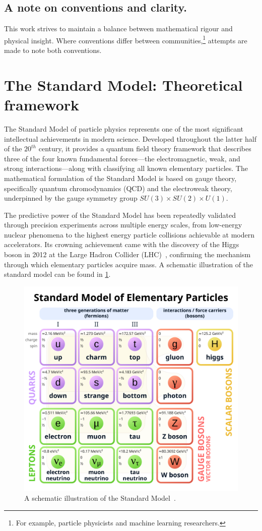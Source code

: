 \begin{definition}
    \subsection{A note on conventions and clarity.}
         This work strives to maintain a balance between mathematical rigour and physical insight.
         Where conventions differ between communities,\footnote{For example, particle physicists and machine learning researchers.} attempts are made to note both conventions.
         
\section{The Standard Model: Theoretical framework}
The Standard Model of particle physics represents one of the most significant intellectual achievements in modern science.
%
Developed throughout the latter half of the $20^{th}$ century, it provides a quantum field theory framework that describes three of the four known fundamental forces—the electromagnetic, weak, and strong interactions---along with classifying all known elementary particles.
%
The mathematical formulation of the Standard Model is based on gauge theory, specifically quantum chromodynamics (QCD) and the electroweak theory, underpinned by the gauge symmetry group \(SU(3)\times SU(2)\times U(1)\).

The predictive power of the Standard Model has been repeatedly validated through precision experiments across multiple energy scales, from low-energy nuclear phenomena to the highest energy particle collisions achievable at modern accelerators.
%
Its crowning achievement came with the discovery of the Higgs boson in 2012 at the Large Hadron Collider (LHC)~\cite{ATLAS:2012yve, collaboration_observation_2012}, confirming the mechanism through which elementary particles acquire mass.
%
A schematic illustration of the standard model can be found in \cref{fig:sm}.

\begin{figure}
    \centering
    \includegraphics[width=0.5\linewidth]{figures/chapter-01/Standard_Model_of_Elementary_Particles.svg.png}
    \caption{
        A schematic illustration of the Standard Model~\cite{wiki:stdmodel}.
    }
    \label{fig:sm}
\end{figure}

\end{definition}
